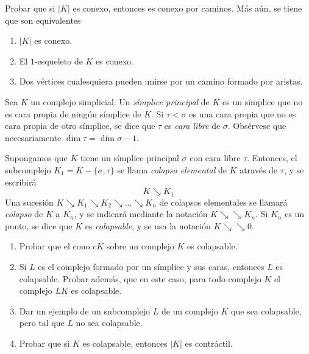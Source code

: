 \documentclass[twoside]{article}
\newcommand{\colapso}{{\searrow\!\!\!\!\searrow}}
\begin{document}
\newpage

\begin{ejercicio}{1.5}
Probar que si $|K|$ es conexo, entonces es conexo por caminos.
Más aún, se tiene que son equivalentes
\begin{enumerate}
\item $|K|$ es conexo.
\item El $1$-esqueleto de $K$ es conexo.
\item Dos vértices cualesquiera pueden unirse por un camino formado por aristas.
\end{enumerate}
\end{ejercicio}
\begin{solucion}
\end{solucion}

\newpage

\begin{ejercicio}{1.6}
Sea $K$ un complejo simplicial.
Un \emph{símplice principal} de $K$ es un símplice que no es cara propia de ningún símplice de $K$.
Si $τ < σ$ es una cara propia que no es cara propia de otro símplice, se dice que $τ$ es \emph{cara libre} de $σ$.
Obsérvese que necesariamente $\dim τ = \dim σ - 1$.

Supongamos que $K$ tiene un símplice principal $σ$ con cara libre $τ$.
Entonces, el subcomplejo $K_1 = K - \{σ,τ\}$ se llama \emph{colapso elemental} de $K$ através de $τ$, y se escribirá
\[ K \searrow K_1 \]
Una sucesión $K \searrow K_1 \searrow K_2 \searrow \dots \searrow K_n$ de colapsos elementales se llamará \emph{colapso} de $K$ a $K_n$, y se indicará mediante la notación $K \colapso K_n$.
Si $K_n$ es un punto, se dice que $K$ es \emph{colapsable}, y se usa la notación $K \colapso 0$.
\begin{enumerate}
\item Probar que el cono $cK$ sobre un complejo $K$ es colapsable.
\item Si $L$ es el complejo formado por un símplice y sus caras, entonces $L$ es colapsable.
Probar además, que en este caso, para todo complejo $K$ el complejo $LK$ es colapsable.
\item Dar un ejemplo de un subcomplejo $L$ de un complejo $K$ que sea colapsable, pero tal que $L$ no sea colapsable.
\item Probar que si $K$ es colapsable, entonces $|K|$ es contráctil.
\end{enumerate}
\end{ejercicio}
\begin{solucion}
\end{solucion}
\end{document}
